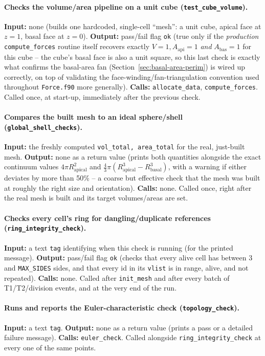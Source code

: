 \documentclass[11pt,a4paper]{report}
\begin{document}
\paragraph{Checks the volume/area pipeline on a unit cube
(\texttt{test\_cube\_volume}).} \textbf{Input:} none (builds one
hardcoded, single-cell ``mesh'': a unit cube, apical face at $z=1$,
basal face at $z=0$). \textbf{Output:} pass/fail flag \texttt{ok}
(true only if the \emph{production} \texttt{compute\_forces} routine
itself recovers exactly $V=1, A_{\mathrm{api}}=1$ \emph{and}
$A_{\mathrm{bas}}=1$ for this cube -- the cube's basal face is also a
unit square, so this last check is exactly what confirms the basal-area
fan (Section~\ref{sec:basal-area-perim}) is wired up correctly, on top
of validating the face-winding/fan-triangulation convention used
throughout \texttt{Force.f90} more generally). \textbf{Calls:}
\texttt{allocate\_data}, \texttt{compute\_forces}. Called once, at
start-up, immediately after the previous check.
\paragraph{Compares the built mesh to an ideal sphere/shell
(\texttt{global\_shell\_checks}).} \textbf{Input:} the freshly computed
\texttt{vol\_total, area\_total} for the real, just-built mesh.
\textbf{Output:} none as a return value (prints both quantities
alongside the exact continuum values $4\pi R_{\mathrm{apical}}^2$ and
$\tfrac{4}{3}\pi(R_{\mathrm{apical}}^3-R_{\mathrm{basal}}^3)$, with a
warning if either deviates by more than 50\% -- a coarse but effective
check that the mesh was built at roughly the right size and
orientation). \textbf{Calls:} none. Called once, right after the real
mesh is built and its target volumes/areas are set.
\paragraph{Checks every cell's ring for dangling/duplicate references
(\texttt{ring\_integrity\_check}).} \textbf{Input:} a text
\texttt{tag} identifying when this check is running (for the printed
message). \textbf{Output:} pass/fail flag \texttt{ok} (checks that
every alive cell has between 3 and \texttt{MAX\_SIDES} sides, and that
every id in its \texttt{vlist} is in range, alive, and not repeated).
\textbf{Calls:} none. Called after \texttt{init\_mesh} and after every
batch of T1/T2/division events, and at the very end of the run.
\paragraph{Runs and reports the Euler-characteristic check
(\texttt{topology\_check}).} \textbf{Input:} a text \texttt{tag}.
\textbf{Output:} none as a return value (prints a pass or a detailed
failure message). \textbf{Calls:} \texttt{euler\_check}. Called
alongside \texttt{ring\_integrity\_check} at every one of the same
points.
\end{document}
